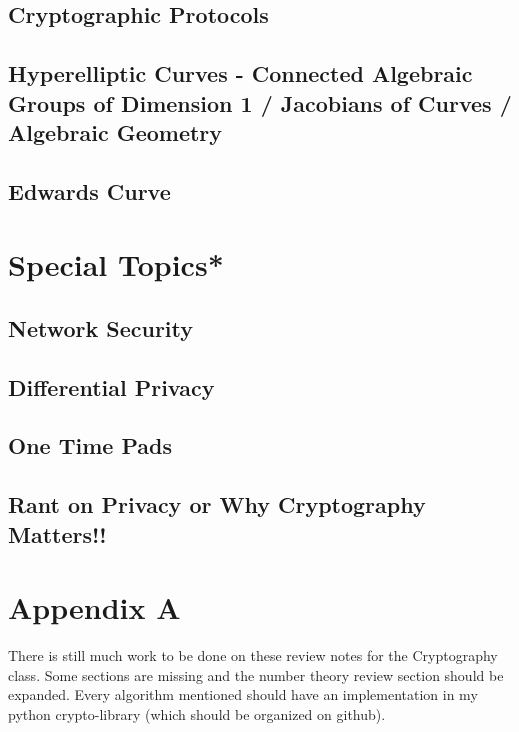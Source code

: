 \documentclass[12pt,a4paper]{article}
\begin{document}
\subsection{Cryptographic Protocols}
\subsection{Hyperelliptic Curves - Connected Algebraic Groups of Dimension 1 / Jacobians of Curves / Algebraic Geometry}
\subsection{Edwards Curve}

\section{Special Topics*}
\subsection{Network Security}
\subsection{Differential Privacy}
\subsection{One Time Pads}
\subsection{Rant on Privacy or Why Cryptography Matters!!}

\section{Appendix A}
There is still much work to be done on these review notes for the Cryptography class. Some sections are missing and the number theory review section should be expanded. Every algorithm mentioned should have an implementation in my python crypto-library (which should be organized on github). 
\end{document}
